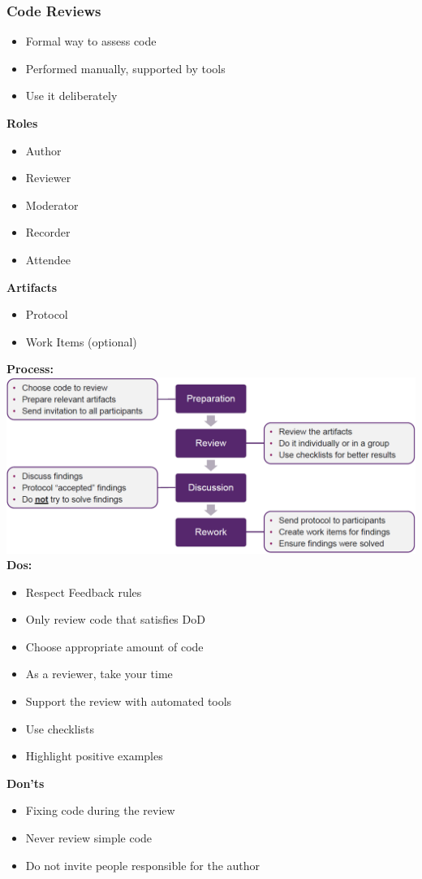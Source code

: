 \subsubsection{Code Reviews}
\begin{itemize}
    \item Formal way to assess code
    \item Performed manually, supported by tools
    \item Use it deliberately
\end{itemize}
\textbf{Roles}
\begin{itemize}
    \item Author
    \item Reviewer
    \item Moderator
    \item Recorder
    \item Attendee
\end{itemize}
\textbf{Artifacts}
\begin{itemize}
    \item Protocol
    \item Work Items (optional)
\end{itemize}
\textbf{Process:}
\includegraphics[width=\linewidth]{../img/code_reviews_process.png}
\textbf{Dos:}
\begin{itemize}
    \item Respect Feedback rules
    \item Only review code that satisfies DoD
    \item Choose appropriate amount of code
    \item As a reviewer, take your time
    \item Support the review with automated tools
    \item Use checklists
    \item Highlight positive examples
\end{itemize}
\textbf{Don'ts}
\begin{itemize}
    \item Fixing code during the review
    \item Never review simple code
    \item Do not invite people responsible for the author
\end{itemize}

